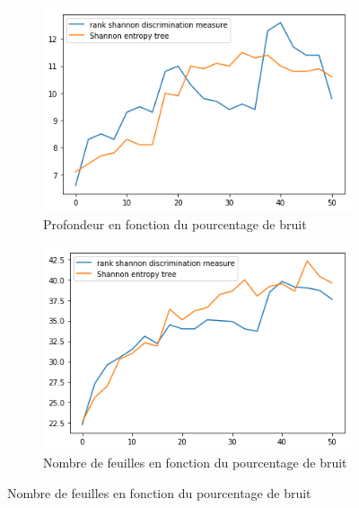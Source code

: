\documentclass[a4paper]{article}
\begin{document}
\begin{figure}[H]
    \begin{subfigure}[c]{0.46\textwidth}
        \centering
        \includegraphics[width=\textwidth]{images/depth_5.png}
        \caption{Profondeur en fonction du pourcentage de bruit}
    \end{subfigure}
    \begin{subfigure}[c]{0.46\textwidth}
        \centering
        \includegraphics[width=\textwidth]{images/leaves_5.png}
        \caption{Nombre de feuilles en fonction du pourcentage de bruit}
    \end{subfigure}


\end{figure}
\end{document}
